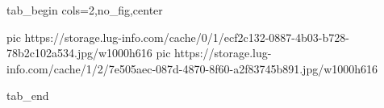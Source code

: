  
 
 
 
 


\ifcmt
  tab_begin cols=2,no_fig,center

     pic https://storage.lug-info.com/cache/0/1/ecf2c132-0887-4b03-b728-78b2c102a534.jpg/w1000h616
		 pic https://storage.lug-info.com/cache/1/2/7e505aec-087d-4870-8f60-a2f83745b891.jpg/w1000h616

  tab_end
\fi
